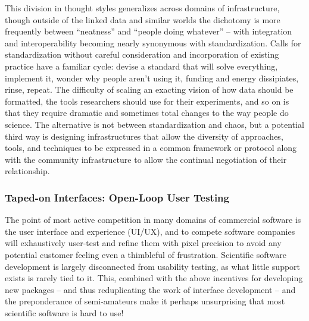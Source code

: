 \documentclass[10pt]{article}
\begin{document}
\begin{multicols}{2}
This division in thought styles generalizes across domains of
infrastructure, though outside of the linked data and similar worlds the
dichotomy is more frequently between ``neatness'' and ``people doing
whatever'' -- with integration and interoperability becoming nearly
synonymous with standardization. Calls for standardization without
careful consideration and incorporation of existing practice have a
familiar cycle: devise a standard that will solve everything, implement
it, wonder why people aren't using it, funding and energy dissipiates,
rinse, repeat. The difficulty of scaling an exacting vision of how data
should be formatted, the tools researchers should use for their
experiments, and so on is that they require dramatic and sometimes total
changes to the way people do science. The alternative is not between
standardization and chaos, but a potential third way is designing
infrastructures that allow the diversity of approaches, tools, and
techniques to be expressed in a common framework or protocol along with
the community infrastructure to allow the continual negotiation of their
relationship.

\hypertarget{taped-on-interfaces-open-loop-user-testing}{%
\subsubsection{Taped-on Interfaces: Open-Loop User
Testing}\label{taped-on-interfaces-open-loop-user-testing}}

The point of most active competition in many domains of commercial
software is the user interface and experience (UI/UX), and to compete
software companies will exhaustively user-test and refine them with
pixel precision to avoid any potential customer feeling even a
thimbleful of frustration. Scientific software development is largely
disconnected from usability testing, as what little support exists is
rarely tied to it. This, combined with the above incentives for
developing new packages -- and thus reduplicating the work of interface
development -- and the preponderance of semi-amateurs make it perhaps
unsurprising that most scientific software is hard to use!


\end{multicols}
\end{document}
